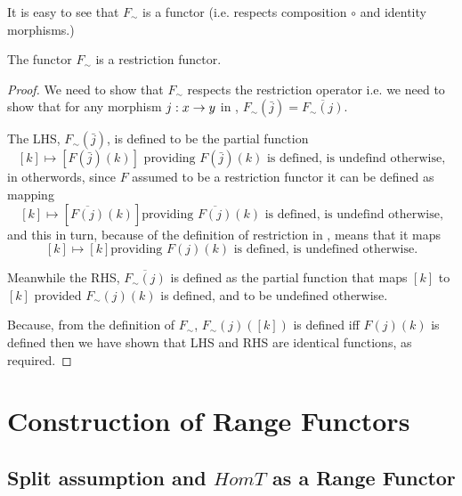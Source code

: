 \documentclass[10pt,a4paper]{article}
\theoremstyle{remark}
\begin{document}
It is easy to see that $F_\sim$ is a functor (i.e. respects composition $\circ$ and identity morphisms.)

\begin{lemma}
The functor $F_\sim$ is a restriction functor.
\end{lemma}
\begin{proof}
We need to show that  $F_\sim$ respects the restriction operator
i.e. we need to show that for any morphism $j:x \rightarrow y$ in \catcw, $F_\sim(\bar{j})= \overline{F_\sim(j)}$.

The LHS, $F_\sim(\bar{j})$, is defined to  be the partial function
$$ [k] \mapsto [F(\bar{j})(k)] \mbox{ providing $F(\bar{j})(k)$ is defined, is undefind otherwise,}$$
in otherwords, since  $F$ assumed to be a restriction functor it can be defined as mapping
$$ [k] \mapsto [\overline{F(j)}(k)] \mbox{providing $\overline{F(j)}(k)$ is defined, is undefind otherwise,}$$
and this in turn, because of the definition of restriction in \SetP, means that it maps
$$ [k] \mapsto [k] \mbox{providing $F(j)(k)$ is defined, is undefined otherwise.}$$

Meanwhile the RHS, $\overline{F_\sim(j)}$  is defined as the partial function that 
maps $[k]$  to $[k]$  provided  $F_\sim(j)(k)$ is defined, and to be undefined otherwise.

Because,
from the definition of $F_\sim$, $F_\sim(j)([k])$ is defined iff $F(j)(k)$ is defined then
we have shown that LHS and RHS are identical functions, as required.
\end{proof}

\section{Construction of Range Functors}

\subsection{Split assumption and $HomT$ as a Range Functor}
\end{document}
